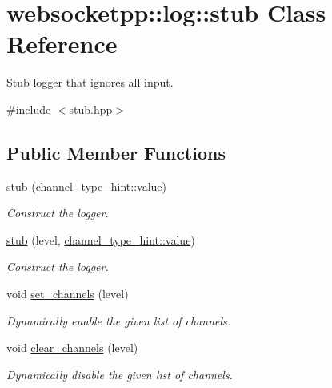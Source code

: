 \hypertarget{classwebsocketpp_1_1log_1_1stub}{}\section{websocketpp\+:\+:log\+:\+:stub Class Reference}
\label{classwebsocketpp_1_1log_1_1stub}


Stub logger that ignores all input.  




{\ttfamily \#include $<$stub.\+hpp$>$}

\subsection*{Public Member Functions}
\begin{DoxyCompactItemize}
\item 
\mbox{\hyperlink{classwebsocketpp_1_1log_1_1stub_ae28cf7e38cfb64008c4b5b3e90621ad9}{stub}} (\mbox{\hyperlink{structwebsocketpp_1_1log_1_1channel__type__hint_ad12a7f6555b71aabdc4cbec604dc89dd}{channel\+\_\+type\+\_\+hint\+::value}})
\begin{DoxyCompactList}\small\item\em Construct the logger. \end{DoxyCompactList}\item 
\mbox{\hyperlink{classwebsocketpp_1_1log_1_1stub_a45e96ad7f1a562c446645961d8d24784}{stub}} (level, \mbox{\hyperlink{structwebsocketpp_1_1log_1_1channel__type__hint_ad12a7f6555b71aabdc4cbec604dc89dd}{channel\+\_\+type\+\_\+hint\+::value}})
\begin{DoxyCompactList}\small\item\em Construct the logger. \end{DoxyCompactList}\item 
void \mbox{\hyperlink{classwebsocketpp_1_1log_1_1stub_acdaf1728646e2477cf7243b13f71e18d}{set\+\_\+channels}} (level)
\begin{DoxyCompactList}\small\item\em Dynamically enable the given list of channels. \end{DoxyCompactList}\item 
void \mbox{\hyperlink{classwebsocketpp_1_1log_1_1stub_af4bea37fd436439b0ab19238b2c47d15}{clear\+\_\+channels}} (level)
\begin{DoxyCompactList}\small\item\em Dynamically disable the given list of channels. \end{DoxyCompactList}\item 

\end{DoxyCompactItemize}
